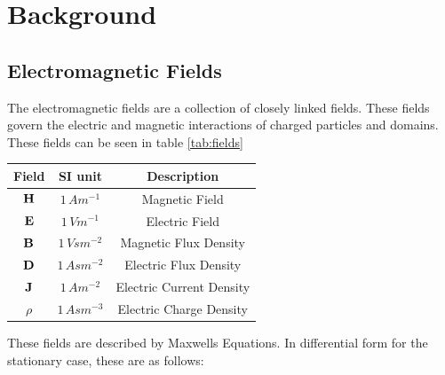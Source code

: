 \chapter{Background}

\section{Electromagnetic Fields}
The electromagnetic fields are a collection of closely linked fields.
These fields govern the electric and magnetic interactions of charged
particles and domains. These fields can be seen in table \ref{tab:fields}

\begin{center}
    \begin{tabular}{c c c}
        \label{tab:fields}
        Field    & SI unit         & Description              \\
        \hline
        $\vb{H}$ & $1\, Am^{-1} $  & Magnetic Field           \\
        $\vb{E}$ & $1\, Vm^{-1} $  & Electric Field           \\
        $\vb{B}$ & $1\, Vsm^{-2} $ & Magnetic Flux Density    \\
        $\vb{D}$ & $1\, Asm^{-2} $ & Electric Flux Density    \\
        $\vb{J}$ & $1\, Am^{-2} $  & Electric Current Density \\
        $\rho$   & $1\, Asm^{-3} $ & Electric Charge Density
    \end{tabular}
\end{center}
These fields are described by Maxwells Equations.
In differential form for the stationary case, these are as follows:

